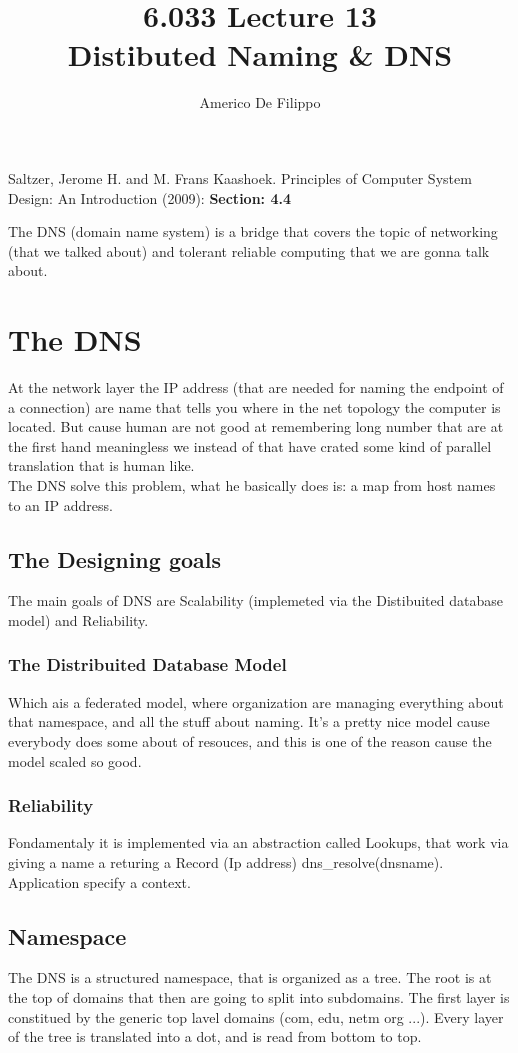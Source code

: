 \documentclass{article}
\title{6.033 Lecture 13 \\ Distibuted Naming \& DNS}
\author{Americo De Filippo}
\begin{document}
 
  \maketitle
  \begin{thebibliography}{9}
    Saltzer, Jerome H. and M. Frans Kaashoek. Principles of Computer System Design: An Introduction (2009): \textbf{Section: 4.4}
  \end{thebibliography}
  The DNS (domain name system) is a bridge that covers the topic of networking (that we 
  talked about) and tolerant reliable computing that we are gonna talk about.
  \section{The DNS}
    At the network layer the IP address (that are needed for naming the endpoint of a 
    connection) are name that tells you where in the net topology the computer is located. 
    But cause human are not good at remembering long number that are at the first hand 
    meaningless we instead of that have crated some kind of parallel translation that is human
    like. \\ The DNS solve this problem, what he basically does is: a map from host names to
    an IP address.
    \subsection{The Designing goals}
      The main goals of DNS are Scalability (implemeted via the Distibuited database 
      model) and Reliability.
      \subsubsection{The Distribuited Database Model}
        Which ais a federated model, where organization are managing everything about that
        namespace, and all the stuff about naming. It's a pretty nice model cause everybody 
        does some about of resouces, and this is one of the reason cause the model scaled 
        so good.
      \subsubsection{Reliability}
        Fondamentaly it is implemented via an abstraction called Lookups, that work via 
        giving a name a returing a Record (Ip address) dns\_resolve(dnsname). Application
        specify a context.
    \subsection{Namespace}
      The DNS is a structured namespace, that is organized as a tree. The root is at the top
      of domains that then are going to split into subdomains. The first layer is constitued 
      by the generic top lavel domains (com, edu, netm org ...). Every layer of the tree
      is translated into a dot, and is read from bottom to top.
\end{document}
